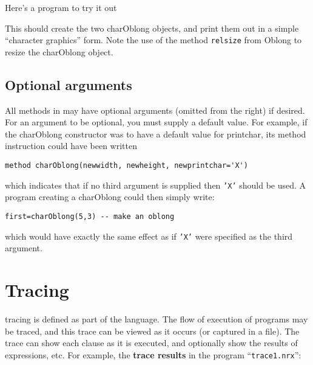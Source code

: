 Here’s a program to try it out

This should create the two charOblong objects, and print them out in a simple “character graphics” form. Note the use of the method \texttt{relsize} from Oblong to resize the charOblong object.
\subsection{Optional arguments}
All methods in \nr{} may have optional arguments (omitted from the
right) if desired. For an argument to be optional, you must supply a
default value. For example, if the charOblong constructor was to have
a default value for printchar, its method instruction could have been
written
\begin{lstlisting}[label=default,caption=Default value X]
method charOblong(newwidth, newheight, newprintchar='X')
\end{lstlisting}
which indicates that if no third argument is supplied then \texttt{'X'} should be used. A program
creating a charOblong could then simply write:
\begin{lstlisting}[label=default,caption=Default value]
first=charOblong(5,3) -- make an oblong
\end{lstlisting}
which would have exactly the same effect as if \texttt{'X'} were specified as
the third argument.


\section{Tracing}
\nr{} tracing is defined as part of the language. The flow of
execution of programs may be traced, and this trace can be viewed as
it occurs (or captured in a file). The trace can show each clause as
it is executed, and optionally show the results of expressions,
etc. For example, the \textbf{trace results} in the program
“\texttt{trace1.nrx}”:



